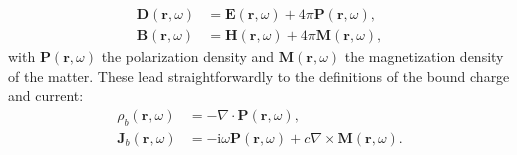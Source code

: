 \documentclass{article}
\begin{document}
\begin{equation}
\begin{split}
\mathbf{D}(\mathbf{r},\omega) &= \mathbf{E}(\mathbf{r},\omega) + 4\pi\mathbf{P}(\mathbf{r},\omega),\\
\mathbf{B}(\mathbf{r},\omega) &= \mathbf{H}(\mathbf{r},\omega) + 4\pi\mathbf{M}(\mathbf{r},\omega),
\end{split}
\end{equation}
with $\mathbf{P}(\mathbf{r},\omega)$ the polarization density and $\mathbf{M}(\mathbf{r},\omega)$ the magnetization density of the matter. These lead straightforwardly to the definitions of the bound charge and current:
\begin{equation}
\begin{split}
\rho_b(\mathbf{r},\omega) &= -\nabla\cdot\mathbf{P}(\mathbf{r},\omega),\\
\mathbf{J}_b(\mathbf{r},\omega) &= -\mathrm{i}\omega\mathbf{P}(\mathbf{r},\omega) + c\nabla\times\mathbf{M}(\mathbf{r},\omega).
\end{split}
\end{equation}
\end{document}
